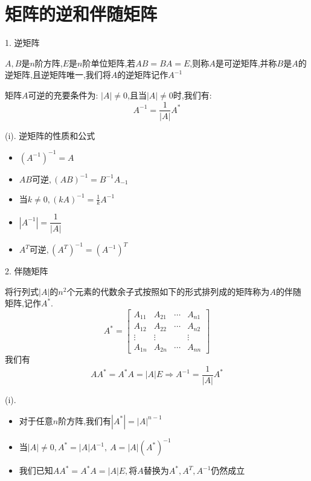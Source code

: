 \section{矩阵的逆和伴随矩阵}
\begin{definition}[矩阵的逆和伴随矩阵]
	1. 逆矩阵
	
	$A,B$是$n$阶方阵,$E$是$n$阶单位矩阵,若$AB=BA=E$,则称$A$是可逆矩阵,并称$B$是$A$的逆矩阵,且逆矩阵唯一,我们将$A$的逆矩阵记作$A^{-1}$
	
	矩阵$A$可逆的充要条件为:  $|A|\neq 0$,且当$|A|\neq 0$时,我们有:  
	$$A^{-1}=\frac{1}{|A|}A^{*}$$
	
	(i). 逆矩阵的性质和公式
	\begin{itemize}
		\item $(A^{-1})^{-1}=A$
		\item $AB\text{可逆},(AB)^{-1}=B^{-1}A_{-1}$
		\item $\text{当}k\neq 0,(kA)^{-1}=\frac{1}{k}A^{-1}$
		\item $|A^{-1}|=\dfrac{1}{|A|}$
		\item $A^{T}\text{可逆},(A^{T})^{-1}=(A^{-1})^{T}$
	\end{itemize}
	
	2. 伴随矩阵
	
	将行列式$|A|$的$n^2$个元素的代数余子式按照如下的形式排列成的矩阵称为$A$的伴随矩阵,记作$A^{*}$.
	$$A^{*}=\left[
	\begin{matrix}
		A_{11}&A_{21}&\cdots&A_{n1}\\
		A_{12}&A_{22}&\cdots&A_{n2}\\
		\vdots&\vdots& &\vdots\\
		A_{1n}&A_{2n}&\cdots&A_{nn}
	\end{matrix}
	\right]$$
	我们有
	$$AA^{*}=A^{*}A=|A|E\Rightarrow A^{-1}=\frac{1}{|A|}A^{*}$$
	
	(i). 
	\begin{itemize}
		\item $\text{对于任意}n\text{阶方阵,我们有}|A^{*}|=|A|^{n-1}$
		\item $\text{当}|A|\neq 0, A^{*}=|A|A^{-1},\ A=|A|(A^{*})^{-1}$
		\item $\text{我们已知}AA^{*}=A^{*}A=|A|E,\text{将}A\text{替换为}A^{*},A^{T},A^{-1}\text{仍然成立}$
	\end{itemize}
\end{definition}
